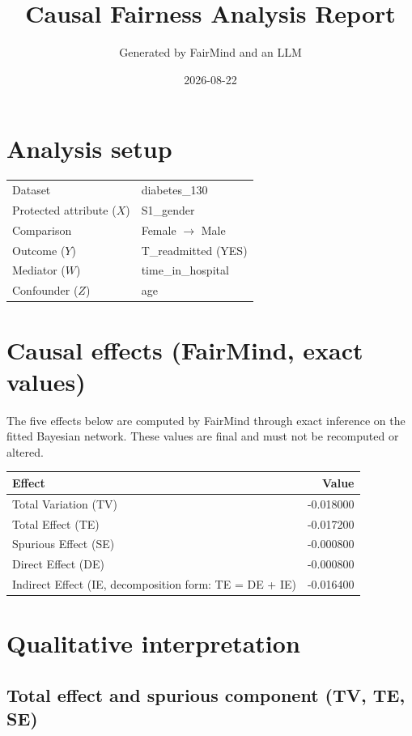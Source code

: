 \documentclass[11pt]{article}
\title{Causal Fairness Analysis Report}
\author{Generated by FairMind and an LLM}
\date{2026-08-22}
\begin{document}
\maketitle

\section{Analysis setup}

\begin{tabular}{ll}
\toprule
Dataset & diabetes\_130 \\
Protected attribute ($X$) & S1\_gender \\
Comparison & Female $\to$ Male \\
Outcome ($Y$) & T\_readmitted (YES) \\
Mediator ($W$) & time\_in\_hospital \\
Confounder ($Z$) & age \\
\bottomrule
\end{tabular}

\section{Causal effects (FairMind, exact values)}

The five effects below are computed by FairMind through exact inference on the
fitted Bayesian network. These values are final and must not be recomputed or
altered.

\begin{tabular}{lr}
\toprule
Effect & Value \\
\midrule
Total Variation (TV) & -0.018000 \\
Total Effect (TE) & -0.017200 \\
Spurious Effect (SE) & -0.000800 \\
Direct Effect (DE) & -0.000800 \\
Indirect Effect (IE, decomposition form: TE = DE + IE) & -0.016400 \\
\bottomrule
\end{tabular}

\section{Qualitative interpretation}

\subsection{Total effect and spurious component (TV, TE, SE)}
\end{document}
